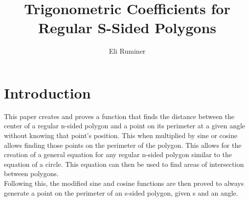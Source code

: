 \documentclass[11pt]{article}
\title{Trigonometric Coefficients for Regular S-Sided Polygons}
\author{Eli Ruminer}
\date{}
\begin{document}
\begin{titlepage}
\clearpage\maketitle
\thispagestyle{empty}
\end{titlepage}

\tableofcontents
\newpage

\section{Introduction}
This paper creates and proves a function that finds the distance between the center of a regular n-sided polygon and a point on its perimeter at a given angle without knowing that point's position. This when multiplied by sine or cosine allows finding those points on the perimeter of the polygon. This allows for the creation of a general equation for any regular n-sided polygon similar to the equation of a circle. This equation can then be used to find areas of intersection between polygons.\\
Following this, the modified sine and cosine functions are then proved to always generate a point on the perimeter of an s-sided polygon, given s and an angle.

\end{document}
